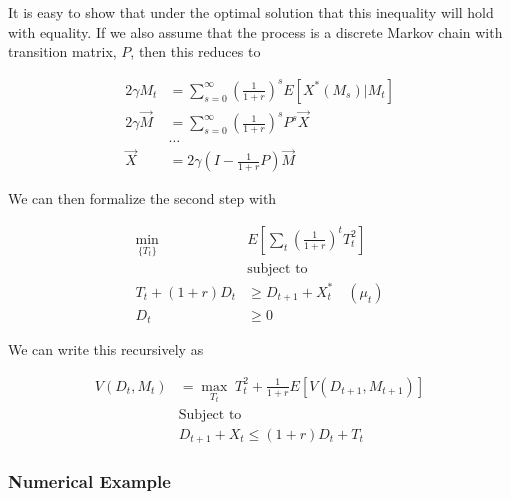 It is easy to show that under the optimal solution that this inequality will hold with equality. If
we also assume that the process is a discrete Markov chain with transition matrix, $P$, then this
reduces to

\begin{align*}
  2 \gamma M_t &= \sum_{s=0}^{\infty} \left( \frac{1}{1+r} \right)^s E \left[X^*(M_s) | M_t \right] \\
  2 \gamma \vec{M} &= \sum_{s=0}^{\infty} \left( \frac{1}{1+r} \right)^s P^s \vec{X} \\
  &\dots \\
  \vec{X} &= 2 \gamma \left(I - \frac{1}{1 + r} P \right) \vec{M}
\end{align*}

We can then formalize the second step with

\begin{align*}
  \min_{\{T_t\}} \; & E \left[ \sum_{t} \left( \frac{1}{1 + r} \right)^t T_t^2 \right] \\
  &\text{subject to} \\
  T_t + (1 + r) D_t &\geq D_{t+1} + X^*_t \quad (\mu_t) \\
  D_t &\geq 0
\end{align*}

We can write this recursively as

\begin{align*}
  V(D_t, M_t) &= \max_{T_t} \; T_t^2 + \frac{1}{1 + r} E [V(D_{t+1}, M_{t+1})] \\
  &\text{Subject to} \\
  &D_{t+1} + X_{t} \leq (1 + r) D_t + T_t
\end{align*}

\subsubsection{Numerical Example}
